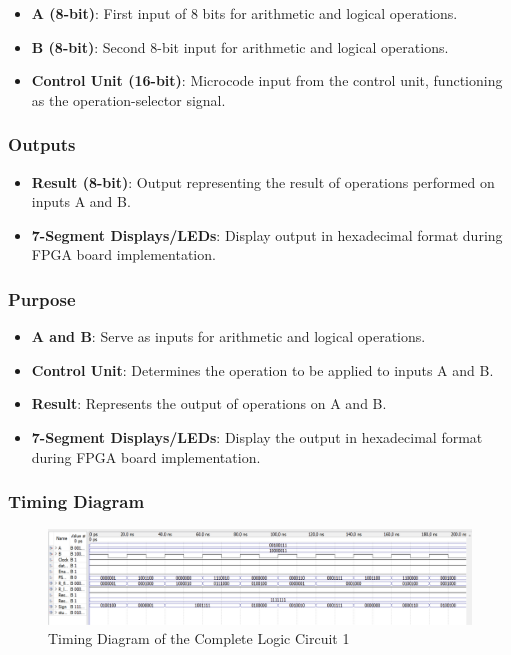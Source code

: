         \begin{itemize}
            \item   {\textbf{A (8-bit)}: First input of 8 bits for arithmetic and logical operations.}
            \item   {\textbf{B (8-bit)}: Second 8-bit input for arithmetic and logical operations.}
            \item   {\textbf{Control Unit (16-bit)}: Microcode input from the control unit, functioning as the operation-selector signal.}
        \end{itemize}

    \subsubsection{{Outputs}}

        \begin{itemize}
            \item   {\textbf{Result (8-bit)}: Output representing the result of operations performed on inputs A and B.}
            \item   {\textbf{7-Segment Displays/LEDs}: Display output in hexadecimal format during FPGA board implementation.}
        \end{itemize}

    \subsubsection{{Purpose}}

        \begin{itemize}
            \item   {\textbf{A and B}: Serve as inputs for arithmetic and logical operations.}
            \item   {\textbf{Control Unit}: Determines the operation to be applied to inputs A and B.}
            \item   {\textbf{Result}: Represents the output of operations on A and B.}
            \item   {\textbf{7-Segment Displays/LEDs}: Display the output in hexadecimal format during FPGA board implementation.}
        \end{itemize}
    
    \subsubsection{{Timing Diagram}}

    \begin{figure}[H]
        \centering
        \includegraphics[width=15cm]{Pictures/ALU1WaveForm.png}
        \caption{{Timing Diagram of the Complete Logic Circuit 1}}
        \label{FSM}
    \end{figure}

